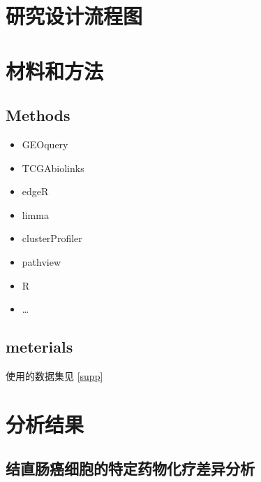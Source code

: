 \documentclass[
]{article}
\providecommand{\tightlist}{%
  \setlength{\itemsep}{0pt}\setlength{\parskip}{0pt}}
\begin{document}
\hypertarget{route}{%
\section{研究设计流程图}\label{route}}

\hypertarget{methods}{%
\section{材料和方法}\label{methods}}

\hypertarget{methods-1}{%
\subsection{Methods}\label{methods-1}}

\begin{itemize}
\tightlist
\item
  GEOquery
\item
  TCGAbiolinks
\item
  edgeR
\item
  limma
\item
  clusterProfiler
\item
  pathview
\item
  R
\item
  \ldots{}
\end{itemize}

\hypertarget{meterials}{%
\subsection{meterials}\label{meterials}}

使用的数据集见 \ref{supp}

\hypertarget{results}{%
\section{分析结果}\label{results}}

\hypertarget{cellDiff}{%
\subsection{结直肠癌细胞的特定药物化疗差异分析}\label{cellDiff}}
\end{document}
